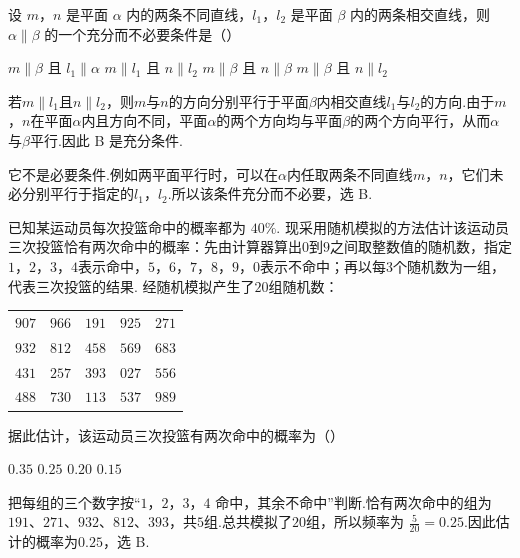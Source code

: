 \begin{problem}
设 \(m\)，\(n\) 是平面 \(\alpha\) 内的两条不同直线，\(l_{1}\)，\(l_{2}\) 是平面 \(\beta\) 内的两条相交直线，则 \(\alpha\parallel\beta\) 的一个充分而不必要条件是（\quad）

\choices
    {\(m\parallel\beta\) 且 \(l_{1}\parallel\alpha\)}
    {\(m\parallel l_{1}\) 且 \(n\parallel l_{2}\)}
    {\(m\parallel\beta\) 且 \(n\parallel\beta\)}
    {\(m\parallel\beta\) 且 \(n\parallel l_{2}\)}

\begin{solution}
若\(m\parallel l_1\)且\(n\parallel l_2\)，则\(m\)与\(n\)的方向分别平行于平面\(\beta\)内相交直线\(l_1\)与\(l_2\)的方向.由于\(m\)，\(n\)在平面\(\alpha\)内且方向不同，平面\(\alpha\)的两个方向均与平面\(\beta\)的两个方向平行，从而\(\alpha\)与\(\beta\)平行.因此 B 是充分条件.

它不是必要条件.例如两平面平行时，可以在\(\alpha\)内任取两条不同直线\(m\)，\(n\)，它们未必分别平行于指定的\(l_1\)，\(l_2\).所以该条件充分而不必要，选 B.
\end{solution}
\end{problem}

\begin{problem}
已知某运动员每次投篮命中的概率都为 \(40\%\). 现采用随机模拟的方法估计该运动员三次投篮恰有两次命中的概率：先由计算器算出\(0\)到\(9\)之间取整数值的随机数，指定\(1\)，\(2\)，\(3\)，\(4\)表示命中，\(5\)，\(6\)，\(7\)，\(8\)，\(9\)，\(0\)表示不命中；再以每\(3\)个随机数为一组，代表三次投篮的结果. 经随机模拟产生了\(20\)组随机数：

\begin{center}
\begin{tabular}{ccccc}
\(907\) & \(966\) & \(191\) & \(925\) & \(271\) \\
\(932\) & \(812\) & \(458\) & \(569\) & \(683\) \\
\(431\) & \(257\) & \(393\) & \(027\) & \(556\) \\
\(488\) & \(730\) & \(113\) & \(537\) & \(989\)
\end{tabular}
\end{center}

据此估计，该运动员三次投篮有两次命中的概率为（\quad）

\choices
    {\(0.35\)}
    {\(0.25\)}
    {\(0.20\)}
    {\(0.15\)}

\begin{solution}
把每组的三个数字按“\(1\)，\(2\)，\(3\)，\(4\) 命中，其余不命中”判断.恰有两次命中的组为
\(191\)、\(271\)、\(932\)、\(812\)、\(393\)，共\(5\)组.总共模拟了\(20\)组，所以频率为
\(\frac{5}{20}=0.25\).因此估计的概率为\(0.25\)，选 B.
\end{solution}
\end{problem}

